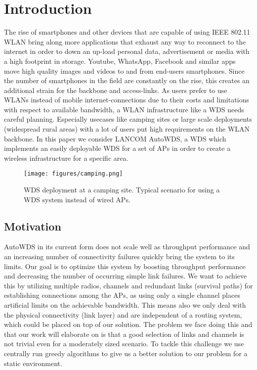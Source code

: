 \chapter{Introduction}
  The rise of smartphones and other devices that are capable of using IEEE 802.11 \ac{WLAN} bring along 
  more applications that exhaust any way to reconnect to the internet in order to 
  down an up-load personal data, advertisement or media with a high footprint in storage.
  Youtube, WhatsApp, Facebook and similar apps move high quality images and videos to and from end-users smartphones. 
  Since the number of smartphones in the field are constantly on the rise, this creates an additional strain for
  the backbone and access-links. As users prefer to use WLANs instead of mobile internet-connections due to their costs and limitations with respect to available bandwidth,
  a \ac{WLAN} infrastructure like a \ac{WDS} needs careful planning. Especially usecases like camping sites or large scale deployments (widespread rural areas) with a lot of users
  put high requirements on the \ac{WLAN} backbone. 
  In this paper we consider LANCOM AutoWDS, a \ac{WDS} which implements an easily deployable \ac{WDS} for a set of APs in order to create a wireless 
  infrastructure for a specific area.

  \begin{figure}[h]
    \centering
    \texttt{[image: figures/camping.png]}
    \caption{WDS deployment at a camping site. Typical scenario for using a \ac{WDS} system instead of wired APs.}
    \label{fig:camping}
  \end{figure}
  
\section{Motivation}
  AutoWDS in its current form does not scale well as throughput performance and an increasing number of connectivity failures quickly bring the system to its limits.
  Our goal is to optimize this system by boosting throughput performance and decreasing the number of occurring simple link failures.
  We want to achieve this by utilizing multiple radios, channels and redundant links (survival paths) for establishing connections among the APs, as using only a single
  channel places artificial limits on the achievable bandwidth.
  This means also we only deal with the physical connectivity (link layer) and are independent of a routing system, which could be placed on top of our solution.
  The problem we face doing this and that our work will elaborate on is that a good selection of links and channels is not trivial even for a moderately sized scenario.
  To tackle this challenge we use centrally run greedy algorithms to give us a better solution to our problem for a static environment.
  
